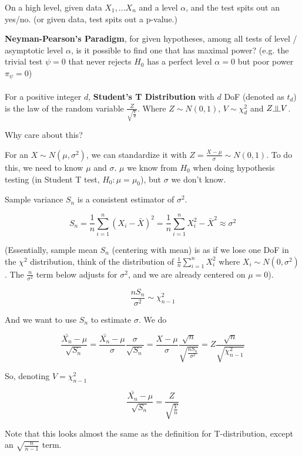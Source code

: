 \documentclass{article}
\newcommand{\indep}{\rotatebox[origin=c]{90}{$\models$}}
\begin{document}
On a high level, given data $X_1, ... X_n$ and a level $\alpha$, and the test spits out an yes/no.
(or given data, test spits out a p-value.)

\textbf{Neyman-Pearson's Paradigm}, for given hypotheses, among all tests of level / asymptotic level $\alpha$, is it possible to find one that has maximal power?
(e.g. the trivial test $\psi = 0$ that never rejects $H_0$ has a perfect level $\alpha = 0$ but poor power $\pi_{\psi} = 0$)
\\
\\

For a positive integer $d$, \textbf{Student's T Distribution} with $d$ DoF (denoted as $t_d$) is the law of the random variable $\frac{Z}{\sqrt{\frac{V}{d}}}$.
Where $Z \sim N(0, 1)$, $V \sim \chi_d^2$ and $Z \indep V$.

Why care about this?

For an $X \sim N(\mu, \sigma^2)$, we can standardize it with $Z = \frac{X - \mu}{\sigma} \sim N(0, 1)$.
To do this, we need to know $\mu$ and $\sigma$.
$\mu$ we know from $H_0$ when doing hypothesis testing (in Student T test, $H_0: \mu = \mu_0$), but $\sigma$ we don't know.

Sample variance $S_n$ is a consistent estimator of $\sigma^2$.

$$
S_n = \frac{1}{n}\sum_{i = 1}^{n}(X_i - \bar{X})^2 = \frac{1}{n}\sum_{i = 1}^{n}X_i^2 - \bar{X}^2 \approx \sigma^2
$$

(Essentially, sample mean $S_n$ (centering with mean) is as if we lose one DoF in the $\chi^2$ distribution, think of the distribution of $\frac{1}{n}\sum_{i=1}^{n}X_i^2$ where $X_i \sim N(0, \sigma^2)$.
The $\frac{n}{\sigma^2}$ term below adjusts for $\sigma^2$, and we are already centered on $\mu = 0$).

$$
\frac{n S_n}{\sigma^2} \sim \chi_{n - 1}^2 
$$

And we want to use $S_n$ to estimate $\sigma$. We do

$$
\frac{\bar{X_n} - \mu}{\sqrt{S_n}} = \frac{\bar{X_n} - \mu}{\sigma} \frac{\sigma}{\sqrt{S_n}} = \frac{X - \mu}{\sigma} \frac{\sqrt{n}}{\sqrt{\frac{n S_n}{\sigma^2}}} = Z \frac{\sqrt{n}}{\sqrt{\chi_{n - 1}^2}}
$$

So, denoting $V = \chi^2_{n-1}$

$$
\frac{\bar{X_n} - \mu}{\sqrt{S_n}} = \frac{Z}{\sqrt{\frac{V}{n}}}
$$

Note that this looks almost the same as the definition for T-distribution, except an $\sqrt{\frac{n}{n - 1}}$ term.
\end{document}
